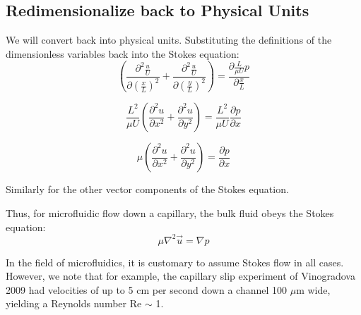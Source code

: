 \documentclass[12pt, a4paper, twoside, openright]{book}
\begin{document}
\subsection{Redimensionalize back to Physical Units}

We will convert back into physical units. Substituting the definitions of the dimensionless variables back into the Stokes equation:
\begin{equation}
\left( \frac{\partial^2  \frac{u}{U}}{\partial (\frac{x}{L})^2} + 
\frac{\partial^2 \frac{u}{U}}{\partial (\frac{y}{L})^2} \right) =
\frac{\partial \frac{L}{\mu U} p}{\partial \frac{x}{L}}
\end{equation}

\begin{equation}
 \frac{L^2}{\mu U} \left( \frac{\partial^2 u}{\partial x^2} + 
\frac{\partial^2 u}{\partial y^2} \right) =
\frac{L^2}{\mu U}  \frac{\partial p}{\partial x}
\end{equation}


\begin{equation}
\mu \left( \frac{\partial^2 u}{\partial x^2} + 
\frac{\partial^2 u}{\partial y^2} \right) =
\frac{\partial p}{\partial x}
\end{equation}

Similarly for the other vector components of the Stokes equation.

\vspace*{1em}
Thus, for microfluidic flow down a capillary, the bulk fluid obeys the Stokes equation:
\begin{equation}
\mu \nabla^2 \vec{u} = \nabla p
\end{equation}

In the field of microfluidics, it is customary to assume Stokes flow in all cases. However, we note that for example, the capillary slip experiment of Vinogradova 2009 \cite{Vinogradova2009} had velocities of up to 5 cm per second down a channel 100 $\mu$m wide, yielding a Reynolds number Re $\sim$ 1.


\end{document}
